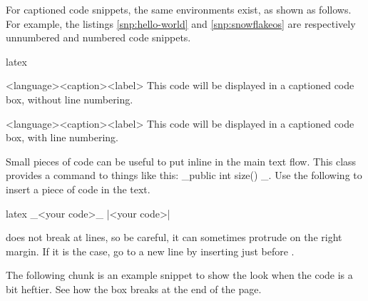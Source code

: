 \documentclass[raggedright, twoside, 11pt, colorful]{tufte-style-article}
\begin{document}
For captioned code snippets, the same environments exist, as shown as follows. For example, the listings \ref{snp:hello-world} and \ref{snp:snowflakeos} are respectively unnumbered and numbered code snippets.

\begin{codebox}{latex}
\begin{snippet}{<language>}{<caption>}{<label>}
This code will be displayed in a captioned code box, without line numbering.
\end{snippet}

\begin{snippetnum}{<language>}{<caption>}{<label>}
This code will be displayed in a captioned code box, with line numbering.
\end{snippetnum}
\end{codebox}

Small pieces of code can be useful to put inline in the main text flow. This class provides a command to things like this: _public int size() {}_. Use the following to insert a piece of code in the text.


\begin{codebox}{latex}
_<your code>_ %
|<your code>|
\end{codebox}

 does not break at lines, so be careful, it can sometimes protrude on the right margin. If it is the case, go to a new line by inserting  just before .


The following chunk is an example snippet to show the look when the code is a bit heftier. See how the box breaks at the end of the page.
\end{document}
